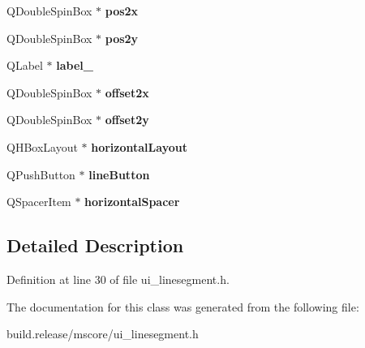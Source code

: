 \begin{DoxyCompactItemize}
Q\+Double\+Spin\+Box $\ast$ {\bfseries pos2x}
\item 
\mbox{\label{class_ui___line_segment_base_ab019aa137610cda715957106d5cb078f}} 
Q\+Double\+Spin\+Box $\ast$ {\bfseries pos2y}
\item 
\mbox{\label{class_ui___line_segment_base_a5753b9b3705f00e80db6e9ef72356ae2}} 
Q\+Label $\ast$ {\bfseries label\+\_}
\item 
\mbox{\label{class_ui___line_segment_base_af151db90694aea3dc1f7141d92cdf30f}} 
Q\+Double\+Spin\+Box $\ast$ {\bfseries offset2x}
\item 
\mbox{\label{class_ui___line_segment_base_a50cec307c118886ce9bea8562d3818a3}} 
Q\+Double\+Spin\+Box $\ast$ {\bfseries offset2y}
\item 
\mbox{\label{class_ui___line_segment_base_a9c88c65104c7dcda33561e0f96384c67}} 
Q\+H\+Box\+Layout $\ast$ {\bfseries horizontal\+Layout}
\item 
\mbox{\label{class_ui___line_segment_base_a1e7843c450a3c6abf7ed62d4c8b92149}} 
Q\+Push\+Button $\ast$ {\bfseries line\+Button}
\item 
\mbox{\label{class_ui___line_segment_base_a067fd86640708b1c2c404dc49fa83644}} 
Q\+Spacer\+Item $\ast$ {\bfseries horizontal\+Spacer}
\end{DoxyCompactItemize}


\subsection{Detailed Description}


Definition at line 30 of file ui\+\_\+linesegment.\+h.



The documentation for this class was generated from the following file\+:\begin{DoxyCompactItemize}
\item 
build.\+release/mscore/ui\+\_\+linesegment.\+h\end{DoxyCompactItemize}
